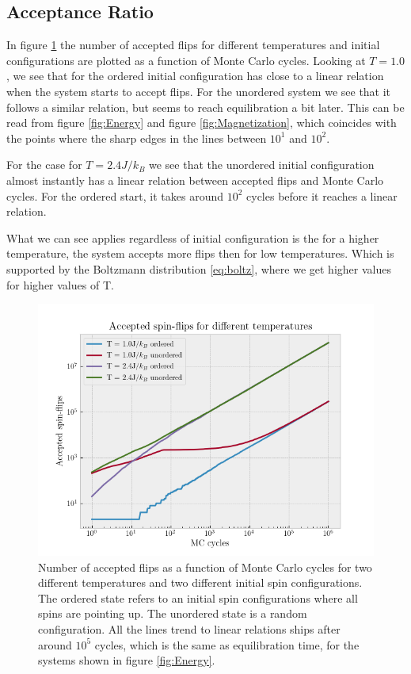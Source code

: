 \documentclass[%
reprint,
nofootinbib,
amsmath,amssymb,
aps,
]{revtex4-1}
\begin{document}
\subsection{Acceptance Ratio} %
In figure \ref{fig:Accept} the number of accepted flips for different temperatures and initial configurations are plotted as a function of Monte Carlo cycles. Looking at $T=1.0$, we see that for the ordered initial configuration has close to a linear relation when the system starts to accept flips. For the unordered system we see that it follows a similar relation, but seems to reach equilibration a bit later. This can be read from figure \ref{fig:Energy} and figure \ref{fig:Magnetization}, which coincides with the points where the sharp edges in the lines between $10^1$ and $10^2$.

For the case for $T=2.4J/k_B$ we see that the unordered initial configuration almost instantly has a linear relation between accepted flips and Monte Carlo cycles. For the ordered start, it takes around $10^2$ cycles before it reaches a linear relation. 

What we can see applies regardless of initial configuration is the for a higher temperature, the system accepts more flips then for low temperatures. Which is supported by the Boltzmann distribution \eqref{eq:boltz}, where we get higher values for higher values of T.
\begin{figure}
	\centering
	\includegraphics[width=0.95\linewidth]{./figures/Accept.png}
	\caption{Number of accepted flips as a function of Monte Carlo cycles for two different temperatures and two different initial spin configurations. The ordered state refers to an initial spin configurations where all spins are pointing up. The unordered state is a random configuration. All the lines trend to linear relations ships after around $10^5$ cycles, which is the same as equilibration time, for the systems shown in figure \ref{fig:Energy}.}
	\label{fig:Accept}
\end{figure}
\end{document}
